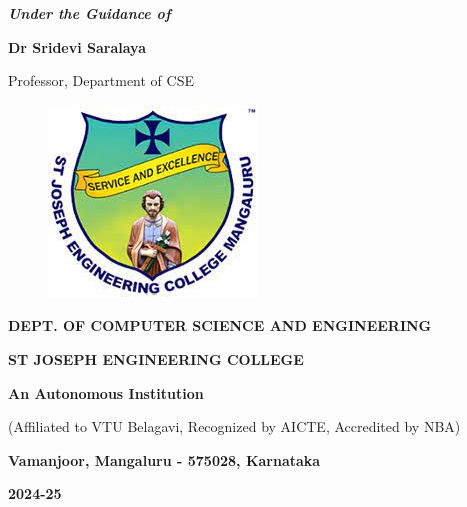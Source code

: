 \documentclass[12pt,a4paper]{report}
\begin{document}
\begin{center}
  \vspace{12pt}
  \textit{\textbf{Under the Guidance of}}
  \par
  \vspace{6pt}
  \textbf{Dr Sridevi Saralaya}
  \par
  \vspace{2pt}
  \normalsize { Professor, Department of CSE }
  \par
  \begin{figure}[hbtp]
    \centering
    \includegraphics[scale=0.5]{./pic/sjeclogo}
  \end{figure}
  \large \textbf{DEPT. OF COMPUTER SCIENCE AND ENGINEERING}
  \par \Large \textbf{ST JOSEPH ENGINEERING COLLEGE}
  \par
  \textbf{An Autonomous Institution}
  \par
  {\large{(Affiliated to VTU Belagavi, Recognized by AICTE, Accredited by NBA)}}
  \par
  \vspace{3pt}
  {\large \textbf{Vamanjoor, Mangaluru - 575028, Karnataka}}
  \par
  \vspace{12pt}
  {\Large \textbf{2024-25}}
\end{center}
\newpage
\end{document}
